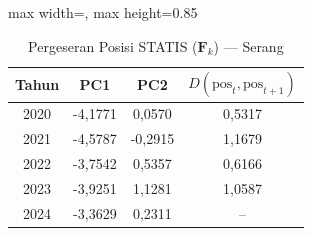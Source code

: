 \begin{table}[H]
\centering
\caption{Pergeseran Posisi STATIS ($\mathbf{F}_k$) --- Serang} \label{tab:app2jarak_statis_skor_serang}
\begin{adjustbox}{max width=\textwidth, max height=0.85\textheight}
\begin{tabular}{|c|c|c|c|}
\hline
\textbf{Tahun} & \textbf{PC1} & \textbf{PC2} & \textbf{$D(\text{pos}_t, \text{pos}_{t+1})$} \\
\hline
2020 & -4,1771 & 0,0570 & 0,5317 \\
2021 & -4,5787 & -0,2915 & 1,1679 \\
2022 & -3,7542 & 0,5357 & 0,6166 \\
2023 & -3,9251 & 1,1281 & 1,0587 \\
2024 & -3,3629 & 0,2311 & -- \\
\hline
\end{tabular}
\end{adjustbox}
\end{table}